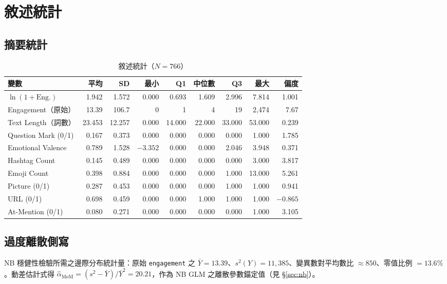 \documentclass[12pt,a4paper]{ctexart}
\begin{document}
\newpage

\section{敘述統計}

\subsection{摘要統計}

\begin{table}[H]
\centering
\caption{敘述統計（$N=766$）}
\label{tab:desc_full}
\small
\begin{tabular}{lrrrrrrrr}
\toprule
變數 & 平均 & SD & 最小 & Q1 & 中位數 & Q3 & 最大 & 偏度 \\
\midrule
$\ln(1+\text{Eng.})$ & 1.942 & 1.572 & 0.000 & 0.693 & 1.609 & 2.996 & 7.814 & 1.001 \\
Engagement（原始） & 13.39 & 106.7 & 0 & 1 & 4 & 19 & 2{,}474 & 7.67 \\
Text Length（詞數） & 23.453 & 12.257 & 0.000 & 14.000 & 22.000 & 33.000 & 53.000 & 0.239 \\
Question Mark (0/1) & 0.167 & 0.373 & 0.000 & 0.000 & 0.000 & 0.000 & 1.000 & 1.785 \\
Emotional Valence & 0.789 & 1.528 & $-3.352$ & 0.000 & 0.000 & 2.046 & 3.948 & 0.371 \\
Hashtag Count & 0.145 & 0.489 & 0.000 & 0.000 & 0.000 & 0.000 & 3.000 & 3.817 \\
Emoji Count & 0.398 & 0.884 & 0.000 & 0.000 & 0.000 & 1.000 & 13.000 & 5.261 \\
Picture (0/1) & 0.287 & 0.453 & 0.000 & 0.000 & 0.000 & 1.000 & 1.000 & 0.941 \\
URL (0/1) & 0.698 & 0.459 & 0.000 & 0.000 & 1.000 & 1.000 & 1.000 & $-0.865$ \\
At-Mention (0/1) & 0.080 & 0.271 & 0.000 & 0.000 & 0.000 & 0.000 & 1.000 & 3.105 \\
\bottomrule
\end{tabular}
\end{table}

\subsection{過度離散側寫}

NB 穩健性檢驗所需之邊際分布統計量：原始 \texttt{engagement} 之 $\bar Y=13.39$、$s^2(Y)=11{,}385$、變異數對平均數比 $\approx 850$、零值比例 $=13.6\%$。動差估計式得 $\hat\alpha_{\text{MoM}}=(s^2-\bar Y)/\bar Y^2 = 20.21$，作為 NB GLM 之離散參數錨定值（見 §\ref{sec:nb}）。
\end{document}
